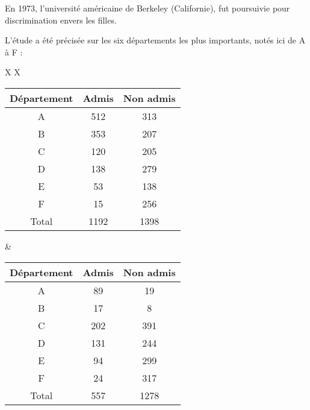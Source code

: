 \documentclass[10pt,dvipsnames, dvips, svgnames]{article}
\begin{document}
En 1973, l'université américaine de Berkeley (Californie), fut poursuivie pour discrimination envers les filles.






L'étude a été précisée sur les six départements les plus importants, notés ici de A à F : 


\begin{tabularx}{\linewidth}{ X X }
    \centering
\begin{tabular}[]{|c |c |c |}
\hline Département  &  Admis & Non admis \\
    \hline A & 512 & 313\\
    \hline B & 353 & 207 \\
    \hline C & 120 & 205 \\
    \hline D & 138 & 279\\
    \hline E & 53 & 138\\
    \hline F & 15 & 256 \\
    \hline Total & 1192 & 1398 \\
\hline 
\end{tabular}
    \label{tab3}
    & 
    \centering
\begin{tabular}[]{|c |c |c |}
\hline Département  &  Admis & Non admis \\
    \hline A & 89 & 19 \\
    \hline B & 17 & 8 \\
    \hline C & 202 & 391 \\
    \hline D & 131 & 244 \\
    \hline E & 94 & 299 \\
    \hline F & 24 & 317 \\
    \hline Total & 557 & 1278 \\
\hline 
\end{tabular}  
    \label{tab4}

\end{tabularx}


\end{document}
